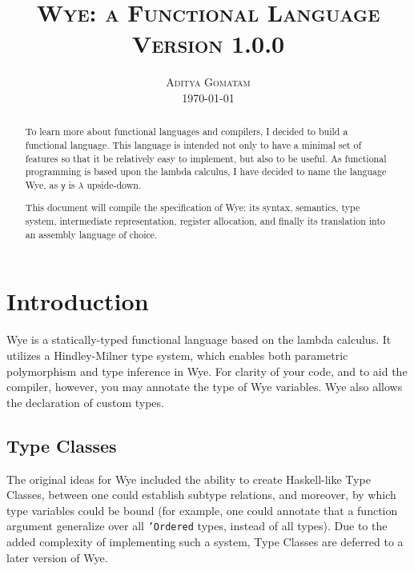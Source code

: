 \documentclass[a4paper, 12pt]{article}
\theoremstyle{myplain}
\theoremstyle{mydefinition}
\theoremstyle{myremark}
\numberwithin{equation} {section}
\numberwithin{figure}   {section}
\numberwithin{table}    {section}
\newcommand{\version}{1.0.0}
\begin{document}
\title{
\textsc{Wye: a Functional Language} \\
\vspace{2ex}
\large{\textsc{Version \version}}\\
\vspace{2ex}}

\author{\normalsize\textsc{Aditya Gomatam} \\ 
\normalsize{\today\vspace{2ex}}}
\date{}
\maketitle


\begin{abstract}
To learn more about functional languages and compilers, I decided to build a functional language. This language is intended not only to have a minimal set of features so that it be relatively easy to implement, but also to be useful. As functional programming is based upon the lambda calculus, I have decided to name the language Wye, as $\mathsf{y}$ is $\lambda$ upside-down.

This document will compile the specification of Wye: its syntax, semantics, type system, intermediate representation, register allocation, and finally its translation into an assembly language of choice.
\end{abstract}

\section{Introduction}
Wye is a statically-typed functional language based on the lambda calculus. It utilizes a Hindley-Milner type system, which enables both parametric polymorphism and type inference in Wye. For clarity of your code, and to aid the compiler, however, you may annotate the type of Wye variables. Wye also allows the declaration of custom types.

\subsection{Type Classes}
The original ideas for Wye included the ability to create Haskell-like Type Classes, between one could establish subtype relations, and moreover, by which type variables could be bound (for example, one could annotate that a function argument generalize over all \texttt{'Ordered} types, instead of all types). Due to the added complexity of implementing such a system, Type Classes are deferred to a later version of Wye.
\end{document}
